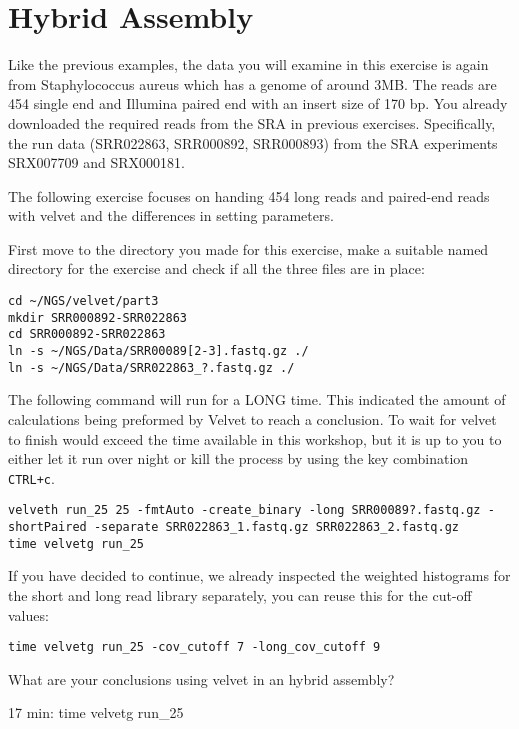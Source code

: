 \section{Hybrid Assembly}
\begin{note}
Like the previous examples, the data you will examine in this exercise is again
from Staphylococcus aureus which has a genome of around 3MB. The reads are 454
single end and Illumina paired end with an insert size of 170 bp.
You already downloaded the required reads from the SRA in previous exercises.
Specifically, the run data (SRR022863, SRR000892, SRR000893) from the SRA
experiments SRX007709 and SRX000181.
\end{note}

\begin{information}
The following exercise focuses on handing 454 long reads and paired-end reads
with velvet and the differences in setting parameters.
\end{information}

\begin{steps}
First move to the directory you made for this exercise, make a suitable named
directory for the exercise and check if all the three files are in place:
\begin{lstlisting}
cd ~/NGS/velvet/part3
mkdir SRR000892-SRR022863 
cd SRR000892-SRR022863
ln -s ~/NGS/Data/SRR00089[2-3].fastq.gz ./   
ln -s ~/NGS/Data/SRR022863_?.fastq.gz ./
\end{lstlisting}
\end{steps}

\begin{warning}
The following command will run for a LONG time. This indicated the amount of
calculations being preformed by Velvet to reach a conclusion. To wait for velvet
to finish would exceed the time available in this workshop, but it is up to you
to either let it run over night or kill the process by using the key combination
\texttt{CTRL+c}.
\begin{lstlisting}
velveth run_25 25 -fmtAuto -create_binary -long SRR00089?.fastq.gz -shortPaired -separate SRR022863_1.fastq.gz SRR022863_2.fastq.gz
time velvetg run_25
\end{lstlisting}

\begin{steps}
If you have decided to continue, we already inspected the weighted histograms
for the short and long read library separately, you can reuse this for the
cut-off values:
\begin{lstlisting}
time velvetg run_25 -cov_cutoff 7 -long_cov_cutoff 9
\end{lstlisting}
\end{steps}

\begin{questions}
What are your conclusions using velvet in an hybrid assembly?
\begin{answer}
17 min:  time velvetg run\_25
\end{answer}
\end{questions}

\end{warning}